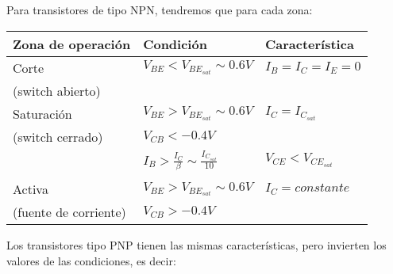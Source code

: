\documentclass[11pt,fancy,lang=es]{elegantbook}
\begin{document}
Para transistores de tipo NPN, tendremos que para cada zona:
\begin{table}
    \centering
    \begin{tabular}{|l|l|l|}
        Zona de operación     & Condición                                           & Característica        \\\hline
        Corte                 & $V_{BE}<V_{BE_{sat}}\sim0.6V$                       & $I_B=I_C=I_E=0$       \\
        (switch abierto)      &                                                     &                       \\\hline
        Saturación            & $V_{BE}>V_{BE_{sat}}\sim0.6V$                       & $I_C= I_{C_{sat}}$    \\
        (switch cerrado)      & $V_{CB}<-0.4V$                                      &                       \\
                              & $I_B>\frac{I_C}{\beta} \sim \frac{I_{C_{sat}}}{10}$ & $V_{CE}<V_{CE_{sat}}$ \\
                              &                                                     &                       \\ \hline
        Activa                & $V_{BE}>V_{BE_{sat}}\sim0.6V$                       & $I_C= constante$      \\
        (fuente de corriente) & $V_{CB}>-0.4V$                                      &                       \\
    \end{tabular}
\end{table}

\newpage
Los transistores tipo PNP tienen las mismas características, pero invierten los valores de las condiciones, es decir:
\end{document}
